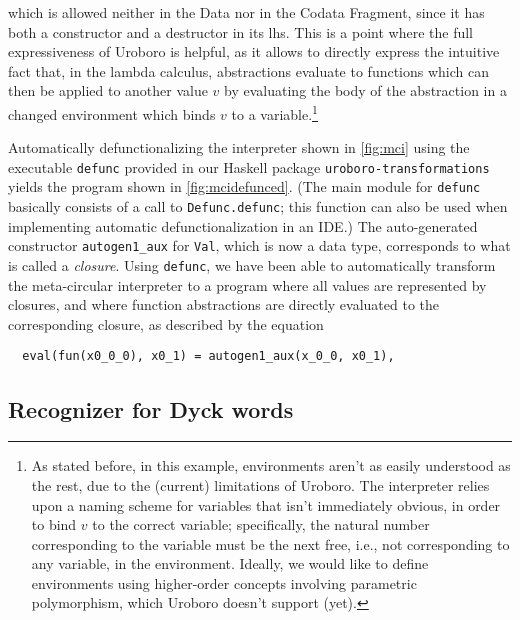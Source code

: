 which is allowed neither in the Data nor in the Codata Fragment, since it has both a constructor and a destructor in its lhs. This is a point where the full expressiveness of Uroboro is helpful, as it allows to directly express the intuitive fact that, in the lambda calculus, abstractions evaluate to functions which can then be applied to another value $v$ by evaluating the body of the abstraction in a changed environment which binds $v$ to a variable.\footnote{As stated before, in this example, environments aren't as easily understood as the rest, due to the (current) limitations of Uroboro. The interpreter relies upon a naming scheme for variables that isn't immediately obvious, in order to bind $v$ to the correct variable; specifically, the natural number corresponding to the variable must be the next free, i.e., not corresponding to any variable, in the environment. Ideally, we would like to define environments using higher-order concepts involving parametric polymorphism, which Uroboro doesn't support (yet).}

Automatically defunctionalizing the interpreter shown in \autoref{fig:mci} using the executable \texttt{defunc} provided in our Haskell package \texttt{uroboro-transformations} yields the program shown in \autoref{fig:mcidefunced}. (The main module for \texttt{defunc} basically consists of a call to \texttt{Defunc.defunc}; this function can also be used when implementing automatic defunctionalization in an IDE.) The auto-generated constructor \texttt{autogen1\_aux} for \texttt{Val}, which is now a data type, corresponds to what is called a \textit{closure}. Using \texttt{defunc}, we have been able to automatically transform the meta-circular interpreter to a program where all values are represented by closures, and where function abstractions are directly evaluated to the corresponding closure, as described by the equation

\begin{lstlisting}
  eval(fun(x0_0_0), x0_1) = autogen1_aux(x_0_0, x0_1),
\end{lstlisting}

\subsection{Recognizer for Dyck words}
\label{ssec:dyck}

